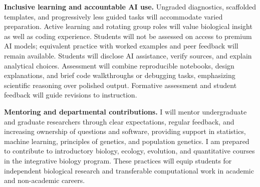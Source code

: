\documentclass[11pt,letterpaper]{article}
\begin{document}
\textbf{Inclusive learning and accountable AI use.}
Ungraded diagnostics, scaffolded templates, and progressively less guided tasks will accommodate varied preparation. Active learning and rotating group roles will value biological insight as well as coding experience. Students will not be assessed on access to premium AI models; equivalent practice with worked examples and peer feedback will remain available. Students will disclose AI assistance, verify sources, and explain analytical choices. Assessment will combine reproducible notebooks, design explanations, and brief code walkthroughs or debugging tasks, emphasizing scientific reasoning over polished output. Formative assessment and student feedback will guide revisions to instruction.

\textbf{Mentoring and departmental contributions.}
I will mentor undergraduate and graduate researchers through clear expectations, regular feedback, and increasing ownership of questions and software, providing support in statistics, machine learning, principles of genetics, and population genetics. I am prepared to contribute to introductory biology, ecology, evolution, and quantitative courses in the integrative biology program. These practices will equip students for independent biological research and transferable computational work in academic and non-academic careers.
\end{document}

